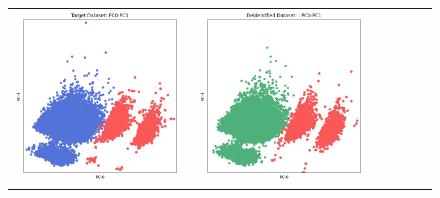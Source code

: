 \begin{figure}[p!]
\begin{tabular}{@{} M{0.166\textwidth} M{0.166\textwidth} | M{0.166\textwidth} M{0.166\textwidth} | M{0.166\textwidth} M{0.166\textwidth} @{}}
       \includegraphics[width=\linewidth]{z_Anonos.orig.png} &
       \includegraphics[width=\linewidth]{z_Anonos.syn.png} &

\end{tabular}
\end{figure}
